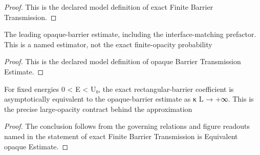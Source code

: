 \begin{proof}
  This is the declared model definition of exact Finite Barrier Transmission.
\end{proof}
\begin{definition}
  \label{def:physics:phyx-mini-0520:phyxminiproblems-problemphyxmini0520-opaquebarriertransmissionestimate}
  The leading opaque-barrier estimate, including the interface-matching prefactor. This is a named estimator, not the exact finite-opacity probability
\end{definition}
\begin{proof}
  This is the declared model definition of opaque Barrier Transmission Estimate.
\end{proof}
\begin{lemma}
  \label{lem:physics:phyx-mini-0520:phyxminiproblems-problemphyxmini0520-exactfinitebarriertransmission-isequivalent-opaqueestimate}
  For fixed energies 0 < E < U₀, the exact rectangular-barrier coefficient is asymptotically equivalent to the opaque-barrier estimate as κ L → +∞. This is the precise large-opacity contract behind the approximation
\end{lemma}
\begin{proof}
  The conclusion follows from the governing relations and figure readouts named in the statement of exact Finite Barrier Transmission is Equivalent opaque Estimate.
\end{proof}
